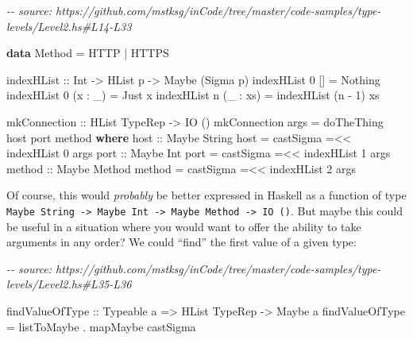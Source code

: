 \documentclass[]{article}
\newenvironment{Shaded}{}{}
\newcommand{\CommentTok}[1]{\textcolor[rgb]{0.38,0.63,0.69}{\textit{#1}}}
\newcommand{\DataTypeTok}[1]{\textcolor[rgb]{0.56,0.13,0.00}{#1}}
\newcommand{\DecValTok}[1]{\textcolor[rgb]{0.25,0.63,0.44}{#1}}
\newcommand{\KeywordTok}[1]{\textcolor[rgb]{0.00,0.44,0.13}{\textbf{#1}}}
\newcommand{\NormalTok}[1]{#1}
\newcommand{\OperatorTok}[1]{\textcolor[rgb]{0.40,0.40,0.40}{#1}}
\newcommand{\OtherTok}[1]{\textcolor[rgb]{0.00,0.44,0.13}{#1}}
\begin{document}
\begin{Shaded}
\begin{Highlighting}[]
\CommentTok{{-}{-} source: https://github.com/mstksg/inCode/tree/master/code{-}samples/type{-}levels/Level2.hs\#L14{-}L33}

\KeywordTok{data} \DataTypeTok{Method} \OtherTok{=} \DataTypeTok{HTTP} \OperatorTok{|} \DataTypeTok{HTTPS}

\OtherTok{indexHList ::} \DataTypeTok{Int} \OtherTok{{-}\textgreater{}} \DataTypeTok{HList}\NormalTok{ p }\OtherTok{{-}\textgreater{}} \DataTypeTok{Maybe}\NormalTok{ (}\DataTypeTok{Sigma}\NormalTok{ p)}
\NormalTok{indexHList }\DecValTok{0}\NormalTok{ [] }\OtherTok{=} \DataTypeTok{Nothing}
\NormalTok{indexHList }\DecValTok{0}\NormalTok{ (x }\OperatorTok{:}\NormalTok{ \_) }\OtherTok{=} \DataTypeTok{Just}\NormalTok{ x}
\NormalTok{indexHList n (\_ }\OperatorTok{:}\NormalTok{ xs) }\OtherTok{=}\NormalTok{ indexHList (n }\OperatorTok{{-}} \DecValTok{1}\NormalTok{) xs}

\OtherTok{mkConnection ::} \DataTypeTok{HList} \DataTypeTok{TypeRep} \OtherTok{{-}\textgreater{}} \DataTypeTok{IO}\NormalTok{ ()}
\NormalTok{mkConnection args }\OtherTok{=}\NormalTok{ doTheThing host port method}
  \KeywordTok{where}
\OtherTok{    host ::} \DataTypeTok{Maybe} \DataTypeTok{String}
\NormalTok{    host }\OtherTok{=}\NormalTok{ castSigma\textquotesingle{} }\OperatorTok{=\textless{}\textless{}}\NormalTok{ indexHList }\DecValTok{0}\NormalTok{ args}
\OtherTok{    port ::} \DataTypeTok{Maybe} \DataTypeTok{Int}
\NormalTok{    port }\OtherTok{=}\NormalTok{ castSigma\textquotesingle{} }\OperatorTok{=\textless{}\textless{}}\NormalTok{ indexHList }\DecValTok{1}\NormalTok{ args}
\OtherTok{    method ::} \DataTypeTok{Maybe} \DataTypeTok{Method}
\NormalTok{    method }\OtherTok{=}\NormalTok{ castSigma\textquotesingle{} }\OperatorTok{=\textless{}\textless{}}\NormalTok{ indexHList }\DecValTok{2}\NormalTok{ args}
\end{Highlighting}
\end{Shaded}

Of course, this would \emph{probably} be better expressed in Haskell as a
function of type
\texttt{Maybe\ String\ -\textgreater{}\ Maybe\ Int\ -\textgreater{}\ Maybe\ Method\ -\textgreater{}\ IO\ ()}.
But maybe this could be useful in a situation where you would want to offer the
ability to take arguments in any order? We could ``find'' the first value of a
given type:

\begin{Shaded}
\begin{Highlighting}[]
\CommentTok{{-}{-} source: https://github.com/mstksg/inCode/tree/master/code{-}samples/type{-}levels/Level2.hs\#L35{-}L36}

\OtherTok{findValueOfType ::} \DataTypeTok{Typeable}\NormalTok{ a }\OtherTok{=\textgreater{}} \DataTypeTok{HList} \DataTypeTok{TypeRep} \OtherTok{{-}\textgreater{}} \DataTypeTok{Maybe}\NormalTok{ a}
\NormalTok{findValueOfType }\OtherTok{=}\NormalTok{ listToMaybe }\OperatorTok{.}\NormalTok{ mapMaybe castSigma\textquotesingle{}}
\end{Highlighting}
\end{Shaded}
\end{document}

